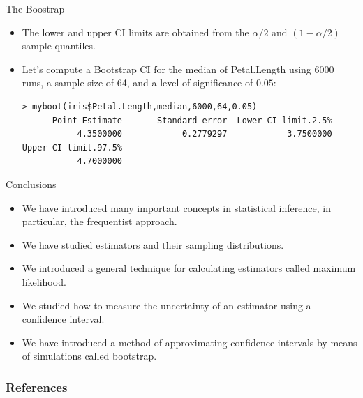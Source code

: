 \documentclass[handout]{beamer}
\begin{document}
\begin{frame}[fragile]{The Boostrap}
\scriptsize{

\begin{itemize}


\item The lower and upper CI limits are obtained from the $\alpha/2$ and $(1-\alpha/2)$ sample quantiles.


\item Let's compute a Bootstrap CI for the median of Petal.Length using $6000$ runs, a sample size of 64, and a level of significance of $0.05$:

\begin{verbatim}
> myboot(iris$Petal.Length,median,6000,64,0.05)
      Point Estimate       Standard error  Lower CI limit.2.5% 
           4.3500000            0.2779297            3.7500000 
Upper CI limit.97.5% 
           4.7000000
\end{verbatim}


\end{itemize}
}
 
\end{frame}


\begin{frame}{Conclusions}
\scriptsize{

\begin{itemize}
\item We have introduced many important concepts in statistical inference, in particular, the frequentist approach.

\item We have studied estimators and their sampling distributions.

\item We introduced a general technique for calculating estimators called maximum likelihood.

\item We studied how to measure the uncertainty of an estimator using a confidence interval.

\item We have introduced a method of approximating confidence intervals by means of simulations called bootstrap.

\end{itemize}
}
 
\end{frame}


\begin{frame}[allowframebreaks]\scriptsize
\frametitle{References}


%
\end{frame}  








\end{document}
